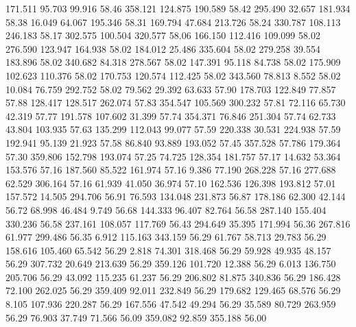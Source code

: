  171.511   95.703   99.916        58.46
 358.121  124.875  190.589        58.42
 295.490   32.657  181.934        58.38
  16.049   64.067  195.346        58.31
 169.794   47.684  213.726        58.24
 330.787  108.113  246.183        58.17
 302.575  100.504  320.577        58.06
 166.150  112.416  109.099        58.02
 276.590  123.947  164.938        58.02
 184.012   25.486  335.604        58.02
 279.258   39.554  183.896        58.02
 340.682   84.318  278.567        58.02
 147.391   95.118   84.738        58.02
 175.909  102.623  110.376        58.02
 170.753  120.574  112.425        58.02
 343.560   78.813    8.552        58.02
  10.084   76.759  292.752        58.02
  79.562   29.392   63.633        57.90
 178.703  122.849   77.857        57.88
 128.417  128.517  262.074        57.83
 354.547  105.569  300.232        57.81
  72.116   65.730   42.319        57.77
 191.578  107.602   31.399        57.74
 354.371   76.846  251.304        57.74
  62.733   43.804  103.935        57.63
 135.299  112.043   99.077        57.59
 220.338   30.531  224.938        57.59
 192.941   95.139   21.923        57.58
  86.840   93.889  193.052        57.45
 357.528   57.786  179.364        57.30
 359.806  152.798  193.074        57.25
  74.725  128.354  181.757        57.17
  14.632   53.364  153.576        57.16
 187.560   85.522  161.974        57.16
   9.386   77.190  268.228        57.16
 277.688   62.529  306.164        57.16
  61.939   41.050   36.974        57.10
 162.536  126.398  193.812        57.01
 157.572   14.505  294.706        56.91
  76.593  134.048  231.873        56.87
 178.186   62.300   42.144        56.72
  68.998   46.484    9.749        56.68
 144.333   96.407   82.764        56.58
 287.140  155.404  330.236        56.58
 237.161  108.057  117.769        56.43
 294.649   35.395  171.994        56.36
 267.816   61.977  299.486        56.35
   6.912  115.163  343.159        56.29
  61.767   58.713   29.783        56.29
 158.616  105.460   65.542        56.29
   2.818   74.301  318.468        56.29
  59.928   49.935   48.157        56.29
 307.732   20.649  213.639        56.29
 359.126  101.720   12.388        56.29
   6.013  136.750  205.706        56.29
  43.092  115.235   61.237        56.29
 206.802   81.875  340.836        56.29
 186.428   72.100  262.025        56.29
 359.409   92.011  232.849        56.29
 179.682  129.465   68.576        56.29
   8.105  107.936  220.287        56.29
 167.556   47.542   49.294        56.29
  35.589   80.729  263.959        56.29
  76.903   37.749   71.566        56.09
 359.082   92.859  355.188        56.00
